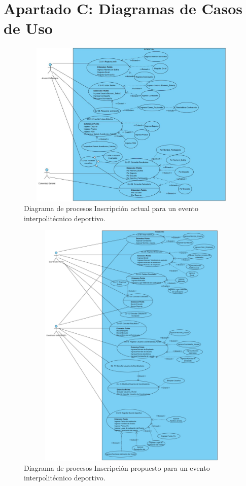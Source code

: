		
	
	\pagebreak
	
	\section{Apartado C: Diagramas de Casos de Uso}
		\begin{figure}[hbt!]
			\centering
			\includegraphics[width=16cm, height=8cm]{Imagenes/Disenos/DiagramasCU/Alumno.jpg}
			\caption{Diagrama de procesos Inscripción actual para un evento interpolitécnico deportivo.}
			\label{Inscripcion}
		\end{figure}
		\begin{figure}[hbt!]
			\centering
			\includegraphics[width=16cm, height=12cm]{Imagenes/Disenos/DiagramasCU/CoordinadoresFinal.jpg}
			\caption{Diagrama de procesos Inscripción propuesto para un evento interpolitécnico deportivo.}
			\label{Inscripcion}
		\end{figure}
	\pagebreak

